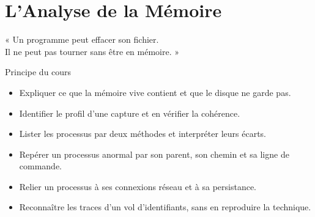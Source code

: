 
\chapter{L'Analyse de la Mémoire}
\label{chap:memoire}

\epigraph{%
    « Un programme peut effacer son fichier.\\
    Il ne peut pas tourner sans être en mémoire. »%
}{Principe du cours}


\begin{boxobjectifs}
\begin{itemize}
    \item Expliquer ce que la mémoire vive contient et que le disque ne
          garde pas.
    \item Identifier le profil d'une capture et en vérifier la cohérence.
    \item Lister les processus par deux méthodes et interpréter leurs
          écarts.
    \item Repérer un processus anormal par son parent, son chemin et sa
          ligne de commande.
    \item Relier un processus à ses connexions réseau et à sa persistance.
    \item Reconnaître les traces d'un vol d'identifiants, sans en
          reproduire la technique.
\end{itemize}
\end{boxobjectifs}

